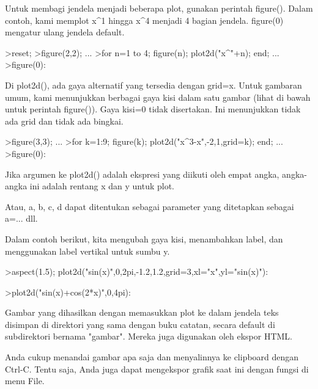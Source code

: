 \documentclass[a4paper,10pt]{article}
\begin{document}
\begin{eulernotebook}
\begin{eulercomment}
\begin{eulercomment}
\begin{eulercomment}
\begin{eulercomment}
\begin{eulercomment}
\begin{eulercomment}
\begin{eulercomment}
\begin{eulercomment}
\begin{eulercomment}
Untuk membagi jendela menjadi beberapa plot, gunakan perintah
figure(). Dalam contoh, kami memplot x\textasciicircum{}1 hingga x\textasciicircum{}4 menjadi 4 bagian
jendela. figure(0) mengatur ulang jendela default.
\end{eulercomment}
\begin{eulerprompt}
>reset;
>figure(2,2); ...
>for n=1 to 4; figure(n); plot2d("x^"+n); end; ...
>figure(0):
\end{eulerprompt}
\begin{eulercomment}
Di plot2d(), ada gaya alternatif yang tersedia dengan grid=x. Untuk
gambaran umum, kami menunjukkan berbagai gaya kisi dalam satu gambar
(lihat di bawah untuk perintah figure()). Gaya kisi=0 tidak
disertakan. Ini menunjukkan tidak ada grid dan tidak ada bingkai.
\end{eulercomment}
\begin{eulerprompt}
>figure(3,3); ...
>for k=1:9; figure(k); plot2d("x^3-x",-2,1,grid=k); end; ...
>figure(0):
\end{eulerprompt}
\begin{eulercomment}
Jika argumen ke plot2d() adalah ekspresi yang diikuti oleh empat
angka, angka-angka ini adalah rentang x dan y untuk plot.

Atau, a, b, c, d dapat ditentukan sebagai parameter yang ditetapkan
sebagai a=... dll.

Dalam contoh berikut, kita mengubah gaya kisi, menambahkan label, dan
menggunakan label vertikal untuk sumbu y.
\end{eulercomment}
\begin{eulerprompt}
>aspect(1.5); plot2d("sin(x)",0,2pi,-1.2,1.2,grid=3,xl="x",yl="sin(x)"):
\end{eulerprompt}
\begin{eulerprompt}
>plot2d("sin(x)+cos(2*x)",0,4pi):
\end{eulerprompt}
\begin{eulercomment}
Gambar yang dihasilkan dengan memasukkan plot ke dalam jendela teks
disimpan di direktori yang sama dengan buku catatan, secara default di
subdirektori bernama "gambar". Mereka juga digunakan oleh ekspor HTML.

Anda cukup menandai gambar apa saja dan menyalinnya ke clipboard
dengan Ctrl-C. Tentu saja, Anda juga dapat mengekspor grafik saat ini
dengan fungsi di menu File.


\end{eulercomment}
\end{eulercomment}
\end{eulercomment}
\end{eulercomment}
\end{eulercomment}
\end{eulercomment}
\end{eulercomment}
\end{eulercomment}
\end{eulercomment}
\end{eulernotebook}
\end{document}
